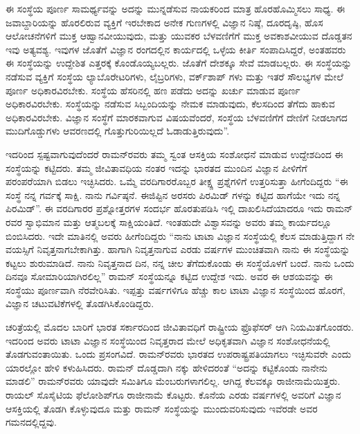 ಈ ಸಂಸ್ಥೆಯ ಪೂರ್ಣ ಸಾಮರ್ಥ್ಯವನ್ನು ಅದನ್ನು ಮುನ್ನಡೆಸುವ ನಾಯಕರಿಂದ ಮಾತ್ರ ಹೊರಹೊಮ್ಮಿಸಲು ಸಾಧ್ಯ. ಈ ಜವಾಬ್ದಾರಿಯನ್ನು ಹೊರಲಿರುವ ವ್ಯಕ್ತಿಗೆ ಇರಬೇಕಾದ ಅನೇಕ ಗುಣಗಳಲ್ಲಿ ವಿಜ್ಞಾನ ನಿಷ್ಠೆ, ದೂರದೃಷ್ಠಿ, ಹೊಸ ಆಲೋಚನೆಗಳಿಗೆ ಮುಕ್ತ ಆಹ್ವಾನವೀಯುವುದು, ಮತ್ತು ಯುವಕರ ಬೆಳವಣಿಗೆಗೆ ಮುಕ್ತ ಅವಕಾಶವೀಯುವ ದೊಡ್ಡತನ\enginline{-} ಇವು ಅತ್ಯವಶ್ಯ. ಇವುಗಳ ಜೊತೆಗೆ ವಿಜ್ಞಾನ ರಂಗದಲ್ಲಿನ ಕಾರ್ಯದಲ್ಲಿ ಒಳ್ಳೆಯ ಕೀರ್ತಿ ಸಂಪಾದಿಸಿದ್ದರೆ, ಅಂತಹವರು ಈ ಸಂಸ್ಥೆಯನ್ನು ಉದ್ದೇಶಿತ ಎತ್ತರಕ್ಕೆ ಕೊಂಡೊಯ್ಯಬಲ್ಲರು. ಜೊತೆಗೆ ದೇಶಕ್ಕೂ ಸೇವೆ ಮಾಡಬಲ್ಲರು. ಈ ಸಂಸ್ಥೆಯನ್ನು ನಡೆಸುವ ವ್ಯಕ್ತಿಗೆ ಸಂಸ್ಥೆಯ ಲ್ಯಾಬೊರೇಟರಿಗಳು, ಲೈಬ್ರರಿಗಳು, ವರ್ಕ್‌ಶಾಪ್ ಗಳು ಮತ್ತು ಇತರೆ ಸೌಲಭ್ಯಗಳ ಮೇಲೆ ಪೂರ್ಣ ಅಧಿಕಾರವಿರಬೇಕು. ಸಂಸ್ಥೆಯ ಹೆಸರಿನಲ್ಲಿ ಹಣ ಪಡೆದು ಅದನ್ನು ಖರ್ಚು ಮಾಡುವ ಪೂರ್ಣ ಅಧಿಕಾರವಿರಬೇಕು. ಸಂಸ್ಥೆಯನ್ನು ನಡೆಸುವ ಸಿಬ್ಬಂದಿಯನ್ನು ನೇಮಕ ಮಾಡುವುದು, ಕೆಲಸದಿಂದ ತೆಗೆದು ಹಾಕುವ ಅಧಿಕಾರವಿರಬೇಕು. ವಿಜ್ಞಾನ ಸಂಸ್ಥೆಗೆ ಮಾರಕವಾಗುವ ವಿಷಯವೆಂದರೆ, ಸಂಸ್ಥೆಯ ಬೆಳವಣಿಗೆಗೆ ದೇಣಿಗೆ ನೀಡಲಾಗದ ಮುದಿಗೊಡ್ಡುಗಳು ಆವರಣದಲ್ಲಿ ಗೊತ್ತುಗುರಿಯಿಲ್ಲದೆ ಓಡಾಡುತ್ತಿರುವುದು”.

ಇದರಿಂದ ಸ್ಪಷ್ಟವಾಗುವುದೆಂದರೆ ರಾಮನ್‍ರವರು ತಮ್ಮ ಸ್ವಂತ ಆಸಕ್ತಿಯ ಸಂಶೋಧನೆ ಮಾಡುವ ಉದ್ದೇಶದಿಂದ ಈ ಸಂಸ್ಥೆಯನ್ನು ಕಟ್ಟಿದರು. ತಮ್ಮ ಜೀವಿತಾವಧಿಯ ನಂತರ ಇದನ್ನು ಭಾರತದ ಮುಂದಿನ ವಿಜ್ಞಾನ ಪೀಳಿಗೆಗೆ ಪರಂಪರೆಯಾಗಿ ಬಿಡಲು ಇಚ್ಛಿಸಿದರು. ಒಮ್ಮೆ ವರದಿಗಾರರೊಬ್ಬರ ತೀಕ್ಷ್ಣ ಪ್ರಶ್ನೆಗಳಿಗೆ ಉತ್ತರಿಸುತ್ತಾ ಹೀಗೆಂದಿದ್ದರು\enginline{-} “ಈ ಸಂಸ್ಥೆ ನನ್ನ ಗರ್ವಕ್ಕೆ ಸಾಕ್ಷಿ. ನಾನು ಗರ್ವಿಷ್ಠನೆ. ಈಜಿಪ್ಟಿನ ಅರಸರು ಪಿರಮಿಡ್ ಗಳನ್ನು ಕಟ್ಟಿದ ಹಾಗೆಯೇ ಇದು ನನ್ನ ಪಿರಮಿಡ್”. ಈ ವರದಿಗಾರರ ಪ್ರಶ್ನೋತ್ತರಗಳ ಸಂದರ್ಭ ಹೊರತುಪಡಿಸಿ ಇಲ್ಲಿ ದಾಖಲಿಸಿದೆಯಾದರೂ ಇದು ರಾಮನ್ ರವರ ಸ್ವಾಭಿಮಾನ ಮತ್ತು ಆತ್ಮಬಲಕ್ಕೆ ಸಾಕ್ಷಿಯಂತಿದೆ. ಇಂತಹುದೇ ವಿಶ್ವಾಸವನ್ನು ಅವರು ತಮ್ಮ ಕಾರ್ಯದಲ್ಲೂ ಬಿಂಬಿಸಿದರು. ಇದೇ ಮಾತಿನಲ್ಲಿ ಅವರು ಹೀಗೆಂದಿದ್ದರು \enginline{-}“ನಾನು ಟಾಟಾ ವಿಜ್ಞಾನ ಸಂಸ್ಥೆಯಲ್ಲಿ ಕೆಲಸ ಮಾಡುತ್ತಿದ್ದಾಗ ನೇ ವಯಸ್ಸಿಗೆ ನಿವೃತ್ತನಾಗಬೇಕಾಗಿತ್ತು. ಹಾಗಾಗಿ ನಿವೃತ್ತನಾಗುವ ಎರಡು ವರ್ಷಗಳ ಮುಂಚಿತವಾಗಿ ನಾನು ಈ ಸಂಸ್ಥೆಯನ್ನು ಕಟ್ಟಲು ಶುರುಮಾಡಿದೆ. ನಾನು ನಿವೃತ್ತನಾದ ದಿನ, ನನ್ನ ಚೀಲ ತೆಗೆದುಕೊಂಡು ಈ ಸಂಸ್ಥೆಯೊಳಗೆ ಬಂದೆ. ನಾನು ಒಂದು ದಿನವೂ ಸೋಮಾರಿಯಾಗಿರಲಿಲ್ಲ” ರಾಮನ್ ಸಂಸ್ಥೆಯನ್ನೂ ಕಟ್ಟಿದ ಉದ್ದೇಶ ಇದು. ಅವರ ಈ ಆಶಯವನ್ನು ಈ ಸಂಸ್ಥೆಯು ಪೂರ್ಣವಾಗಿ ನೆರವೇರಿಸಿತು. ಇಪ್ಪತ್ತು ವರ್ಷಗಳಿಗೂ ಹೆಚ್ಚು ಕಾಲ ಟಾಟಾ ವಿಜ್ಞಾನ ಸಂಸ್ಥೆಯಿಂದ ಹೊರಗೆ, ವಿಜ್ಞಾನ ಚಟುವಟಿಕೆಗಳಲ್ಲಿ ತೊಡಗಿಸಿಕೊಂಡಿದ್ದರು.

ಚರಿತ್ರೆಯಲ್ಲಿ ಮೊದಲ ಬಾರಿಗೆ ಭಾರತ ಸರ್ಕಾರದಿಂದ ಜೀವಿತಾವಧಿಗೆ ರಾಷ್ಟ್ರೀಯ ಫ್ರೊಫೆಸರ್ ಆಗಿ ನಿಯಮಿತಗೊಂಡರು. ಇದರಿಂದ ಅವರು ಟಾಟಾ ವಿಜ್ಞಾನ ಸಂಸ್ಥೆಯಿಂದ ನಿವೃತ್ತರಾದ ಮೇಲೆ ಅಧಿಕೃತವಾಗಿ ವಿಜ್ಞಾನ ಸಂಶೋಧನೆಯಲ್ಲಿ ತೊಡಗುವಂತಾಯಿತು. ಒಂದು ಪ್ರಸಂಗವಿದೆ. ರಾಮನ್‍ರವರು ಭಾರತದ ಉಪರಾಷ್ಟ್ರಪತಿಯಾಗಲು ಇಚ್ಛಿಸುವರೇ ಎಂದು ಯಾರಲ್ಲೋ ಹೇಳಿ ಕಳುಹಿಸಿದರು. ರಾಮನ್ ದೊಡ್ಡದಾಗಿ ನಕ್ಕು ಹೇಳಿದರಂತೆ “ಅದನ್ನು ಕಟ್ಟಿಕೊಂಡು ನಾನೇನು ಮಾಡಲಿ” ರಾಮನ್‍ರವರು ಯಾವುದೇ ಸಮಿತಿಗೂ ಮೆಂಬರುಗಳಾಗಲಿಲ್ಲ. ಆಗಿದ್ದ ಕೆಲವಕ್ಕೂ ರಾಜೀನಾಮೆಯಿತ್ತರು. ರಾಯಲ್ ಸೊಸೈಟಿಯ ಫೆಲೋಶಿಪ್‍ಗೂ ರಾಜೀನಾಮೆ ಕೊಟ್ಟರು. ಕೊನೆಯ ಎರಡು ವರ್ಷಗಳಲ್ಲಿ ಅವರಿಗೆ ವಿಜ್ಞಾನ ಆಸಕ್ತಿಯಲ್ಲಿ ತೊಡಗಿ ಕೊಳ್ಳುವುದೂ ಮತ್ತು ರಾಮನ್ ಸಂಸ್ಥೆಯನ್ನು ಮುಂದುವರಿಸುವುದು ಇವೆರಡೇ ಅವರ ಗಮನದಲ್ಲಿದ್ದವು.


